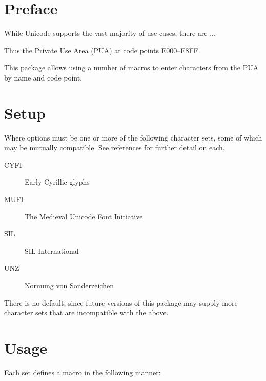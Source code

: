 \section{Preface}

While Unicode supports the vast majority of use cases, there are ...

Thus the Private Use Area (PUA) at code points E000--F8FF.

This package allows using a number of macros to enter characters from the PUA by name and code point.

\section{Setup}

\usepackage[...]{\packagename}

Where options must be one or more of the following character sets, some of which may be mutually compatible. See references for further detail on each.

\begin{description}

\item[CYFI] Early Cyrillic glyphs
\item[MUFI] The Medieval Unicode Font Initiative
\item[SIL] SIL International
\item[UNZ] Normung von Sonderzeichen

\end{description}

There is no default, since future versions of this package may supply more character sets that are incompatible with the above.

\section{Usage}

Each set defines a macro in the following manner:

\mufi{}

